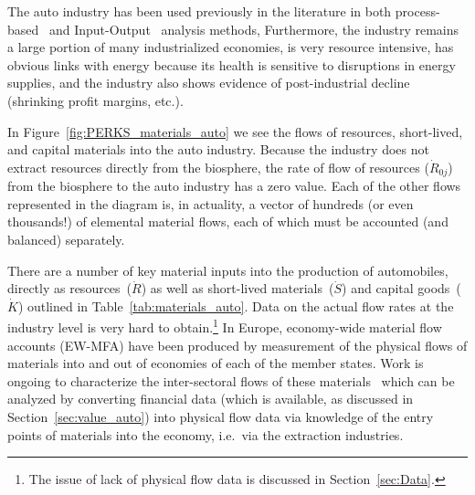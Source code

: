 The auto industry 
has been used previously
in the literature in both 
process-based~\cite{Berry:1973vo, Sullivan1995, Stodolsky1995, 
							Sullivan1998, McCleese2002, Sullivan2010, Hawkins2012}
and Input-Output~\cite{Bullard:1978vd, MacLean1998, MacLean2003}
analysis methods,
Furthermore, the industry
remains a large portion of many industrialized economies, 
is very resource intensive, 
has obvious links with energy because
its health is sensitive to disruptions in energy supplies, and
the industry also shows evidence of 
post-industrial decline (shrinking profit margins, etc.).

In Figure~\ref{fig:PERKS_materials_auto}
we see the flows of resources,
short-lived, and capital materials
into the auto industry.
Because the industry does not
extract resources directly from the biosphere,
the rate of flow of resources ($\dot{R}_{0j}$) 
from the biosphere to the auto industry 
has a zero value.
Each of the other flows represented in the diagram is,
in actuality,
a vector of hundreds (or even thousands!)
of elemental material flows,
each of which must be accounted 
(and balanced) separately.

There are a number of key material inputs into the
production of automobiles, directly as 
resources~($\dot{R}$) as well as short-lived 
materials~($\dot{S}$) and capital goods~($\dot{K}$)
outlined in Table~\ref{tab:materials_auto}. 
Data on the actual flow rates %
at the industry level
is very hard to obtain.\footnote{The issue of 
lack of physical flow data is discussed in 
Section~\ref{sec:Data}.
}
In Europe,
economy-wide material flow accounts (EW-MFA)
have been produced by measurement of the physical flows
of materials into and out of economies of 
each of the member states.\cite{EUROSTAT2011} 
Work is ongoing to characterize the inter-sectoral
flows of these materials~\cite{ConAccount1998}
which can be analyzed by converting financial data 
(which is available, as discussed in 
Section~\ref{sec:value_auto}) into physical flow data
via knowledge of the entry points of materials into the economy,
i.e.\ via the extraction industries.

